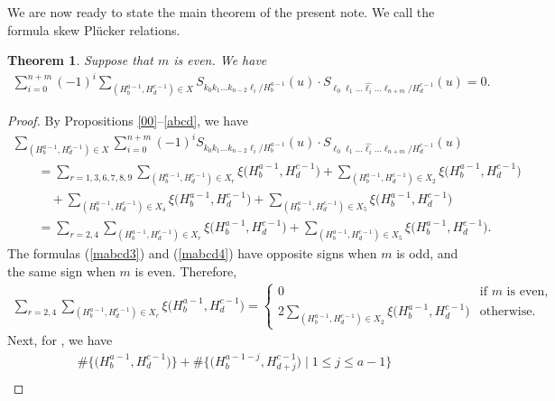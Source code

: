 \documentclass[10pt,a4paper]{amsart}
\numberwithin{equation}{section}
\newtheorem{Theorem}{Theorem}[section]
\begin{document}
We are now ready to state the main theorem of the present note. We call the formula skew Pl\"ucker relations.


\begin{Theorem}%
Suppose that $m$ is even. We have
\begin{gather*}
\sum_{i=0}^{n+m}{(-1)}^{i}\sum_{(H^{a-1}_{b},H^{c-1}_{d})\in X}S_{k_0 k_1 \dots k_{n-2} \ell_i/H^{a-1}_{b}}(u)\cdot S_{\ell_0 \ell_1 \dots \widehat{\ell_i} \dots \ell_{n+m}/H^{c-1}_{d}}(u)=0.
\end{gather*}
\end{Theorem}

\begin{proof}
By Propositions \ref{00}--\ref{abcd}, we have
\begin{gather*}
\sum_{(H^{a-1}_{b},H^{c-1}_{d})\in X}\sum_{i= 0}^{n+m}{(-1)}^{i}S_{k_0 k_1 \dots k_{n-2} \ell_i/H^{a-1}_{b}}(u)\cdot S_{\ell_0 \ell_1 \dots \widehat{\ell_i} \dots \ell_{n+m}/H^{c-1}_{d}}(u)\\
\qquad{}=\sum_{r=1,3,6,7,8,9}\sum_{(H^{a-1}_{b},H^{c-1}_{d})\in X_r}\xi\bigl(H^{a-1}_{b},H^{c-1}_{d}\bigr)+\sum_{(H^{a-1}_{b},H^{c-1}_{d})\in X_2}\xi\bigl(H^{a-1}_{b},H^{c-1}_{d}\bigr)\\
\qquad\quad{}+\sum_{(H^{a-1}_{b},H^{c-1}_{d})\in X_4}\xi\bigl(H^{a-1}_{b},H^{c-1}_{d}\bigr)+\sum_{(H^{a-1}_{b},H^{c-1}_{d})\in X_5}\xi\bigl(H^{a-1}_{b},H^{c-1}_{d}\bigr)\\
\qquad{}=\sum_{r=2,4}\sum_{(H^{a-1}_{b},H^{c-1}_{d})\in X_r}\xi\bigl(H^{a-1}_{b},H^{c-1}_{d}\bigr)+\sum_{(H^{a-1}_{b},H^{c-1}_{d})\in X_5}\xi\bigl(H^{a-1}_{b},H^{c-1}_{d}\bigr).
\end{gather*}
The formulas (\ref{mabcd3}) and (\ref{mabcd4}) have opposite signs when $m$ is odd, and the same sign when $m$ is even. Therefore,
\begin{gather*}
\sum_{r=2,4}\sum_{(H^{a-1}_{b},H^{c-1}_{d})\in X_r}\xi\bigl(H^{a-1}_{b},H^{c-1}_{d}\bigr)=
\begin{cases}
0 & \text{if $m$ is even},\\
\displaystyle 2\sum_{(H^{a-1}_{b},H^{c-1}_{d})\in X_2}\xi\bigl(H^{a-1}_{b},H^{c-1}_{d}\bigr) & \text{otherwise}.
\end{cases}
\end{gather*}
Next, for , we have
\begin{gather*}
\#\bigl\{\bigl(H^{a-1}_{b},H^{c-1}_{d}\bigr)\bigr\}+\#\bigl\{\bigl(H^{a-1-j}_{b},H^{c-1}_{d+j}\bigr)\mid 1\leq j\leq a-1 \bigr\}\\

\end{gather*}
\end{proof}
\end{document}
